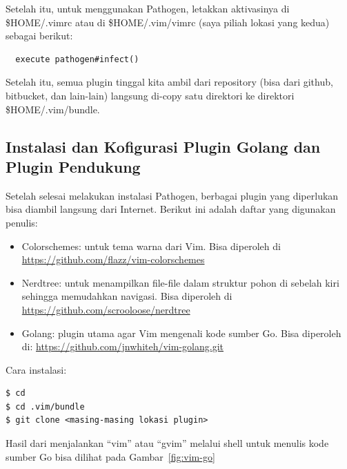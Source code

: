Setelah itu, untuk menggunakan Pathogen, letakkan aktivasinya di \$HOME/.vimrc atau di \$HOME/.vim/vimrc (saya piliah lokasi yang kedua) sebagai berikut:

\begin{mdframed}[style=catatan]
  \begin{verbatim}
  execute pathogen#infect()
  \end{verbatim}
\end{mdframed}

Setelah itu, semua plugin tinggal kita ambil dari repository (bisa dari github, bitbucket, dan lain-lain) langsung di-copy satu direktori ke direktori \$HOME/.vim/bundle.

\subsection{Instalasi dan Kofigurasi Plugin Golang dan Plugin Pendukung}

Setelah selesai melakukan instalasi Pathogen, berbagai plugin yang diperlukan bisa diambil langsung dari Internet. Berikut ini adalah daftar yang digunakan penulis:
\begin{itemize}
  \item Colorschemes: untuk tema warna dari Vim. Bisa diperoleh di \url{https://github.com/flazz/vim-colorschemes}
  \item Nerdtree: untuk menampilkan file-file dalam struktur pohon di sebelah kiri sehingga memudahkan navigasi. Bisa diperoleh di \url{https://github.com/scrooloose/nerdtree}
  \item Golang: plugin utama agar Vim mengenali kode sumber Go. Bisa diperoleh di: \url{https://github.com/jnwhiteh/vim-golang.git}
\end{itemize}

Cara instalasi:

\begin{mdframed}[style=catatan]
  \begin{verbatim}
$ cd 
$ cd .vim/bundle
$ git clone <masing-masing lokasi plugin>
\end{verbatim}
\end{mdframed}

Hasil dari menjalankan ``vim'' atau ``gvim'' melalui shell untuk menulis kode sumber Go bisa dilihat pada Gambar~\ref{fig:vim-go}

